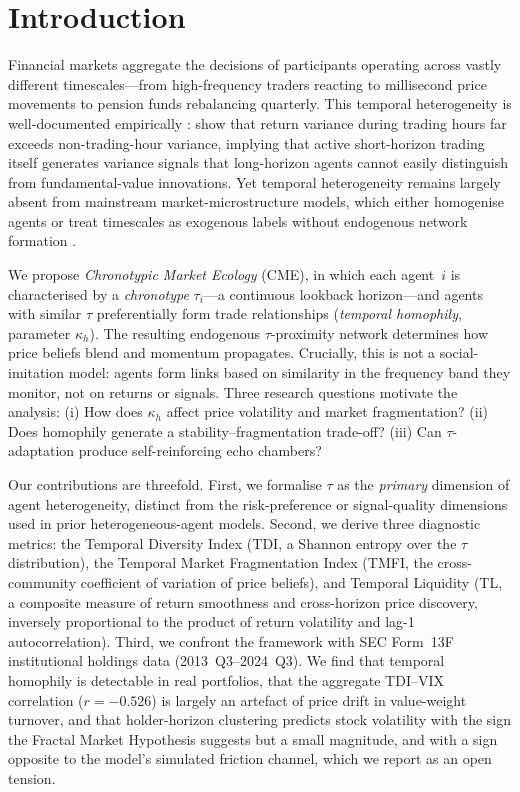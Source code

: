 \documentclass[preprint,12pt,authoryear]{elsarticle}
\begin{document}
\section{Introduction}
\label{sec:intro}

Financial markets aggregate the decisions of participants operating across
vastly different timescales---from high-frequency traders reacting to
millisecond price movements to pension funds rebalancing quarterly.
This temporal heterogeneity is well-documented empirically
\citep{muller1993, corsi2009}: \citet{frenchroll1986} show that return
variance during trading hours far exceeds non-trading-hour variance,
implying that active short-horizon trading itself generates variance
signals that long-horizon agents cannot easily distinguish from
fundamental-value innovations.
Yet temporal heterogeneity remains largely absent from mainstream
market-microstructure models, which either homogenise agents or treat
timescales as exogenous labels without endogenous network formation
\citep{lebaron2001, farmerfoley2009}.

We propose \emph{Chronotypic Market Ecology} (CME), in which each agent~$i$
is characterised by a \emph{chronotype} $\tau_i$---a continuous lookback
horizon---and agents with similar $\tau$ preferentially form trade
relationships (\emph{temporal homophily}, parameter $\kappa_h$).
The resulting endogenous $\tau$-proximity network determines how price
beliefs blend and momentum propagates.
Crucially, this is not a social-imitation model: agents form links
based on similarity in the frequency band they monitor, not on returns or
signals.
Three research questions motivate the analysis: (i) How does $\kappa_h$
affect price volatility and market fragmentation? (ii) Does homophily
generate a stability--fragmentation trade-off? (iii) Can $\tau$-adaptation
produce self-reinforcing echo chambers?

Our contributions are threefold. First, we formalise $\tau$ as the
\emph{primary} dimension of agent heterogeneity, distinct from the
risk-preference or signal-quality dimensions used in prior heterogeneous-agent
models.
Second, we derive three diagnostic metrics: the Temporal Diversity Index
(TDI, a Shannon entropy over the $\tau$ distribution), the Temporal Market
Fragmentation Index (TMFI, the cross-community coefficient of variation of
price beliefs), and Temporal Liquidity (TL, a composite measure of return smoothness and
cross-horizon price discovery, inversely proportional to the product of
return volatility and lag-1 autocorrelation).
Third, we confront the framework with SEC Form~13F institutional holdings
data (2013~Q3--2024~Q3).
We find that temporal homophily is detectable in real portfolios, that the
aggregate TDI--VIX correlation ($r = -0.526$) is largely an artefact of price
drift in value-weight turnover, and that holder-horizon clustering predicts
stock volatility with the sign the Fractal Market Hypothesis suggests but a
small magnitude, and with a sign opposite to the model's simulated friction
channel, which we report as an open tension.
\end{document}

